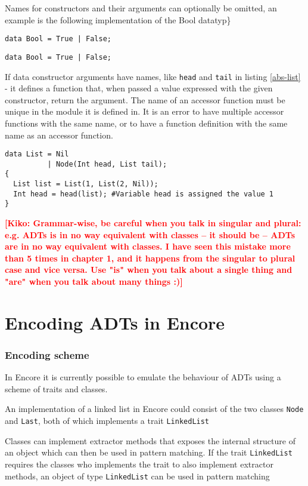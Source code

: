 \documentclass[10pt]{report}
\newcommand{\KIKO}[1]{\textcolor{red}{\textbf{[Kiko: #1]}}}
\def\code#1{\texttt{#1}} %
\begin{document}
\par{Names for constructors and their arguments can optionally be omitted, an example is the following implementation of the Bool datatyp\}

\begin{lstlisting}[language=encore,caption={Actual definition of built-in type Bool},label=test-kiko]
data Bool = True | False;
\end{lstlisting}

\begin{lstlisting}[language=encore,caption={Actual definition of built-in type Bool}]
data Bool = True | False;
\end{lstlisting}
\par{If data constructor arguments have names, like \code{head} and \code{tail} in listing \ref{abs-list} - it defines a function that, when passed a value expressed with the given constructor, return the argument.  The name of an accessor function must be unique in the module it is defined in. It is an error to have multiple accessor functions with the same name, or to have a function definition with the same name as an accessor function.}

\begin{lstlisting}[language=encore,caption={Accessor funtion in ABS},label=abs-list]
data List = Nil
          | Node(Int head, List tail);
{
  List list = List(1, List(2, Nil));
  Int head = head(list); #Variable head is assigned the value 1
}
\end{lstlisting}


\KIKO{Grammar-wise, be careful when you talk in singular and plural: e.g. ADTs is in no way equivalent with classes -- it should be -- ADTs are in no way equivalent with classes. I have seen this mistake more than
5 times in chapter 1, and it happens from the singular to plural case and vice versa. Use "is" when you talk about a single thing and "are" when you talk about many things :)}

\chapter{Encoding ADTs in Encore}
\subsection{Encoding scheme}
\par{In Encore it is currently possible to emulate the behaviour of ADTs using a scheme of traits and classes.}\cite{gustavL}%
\par{An implementation of a linked list in Encore could consist of the two classes \code{Node} and \code{Last}, both of which implements a trait \code{LinkedList}}
\par{Classes can implement extractor methods that exposes the internal structure of an object which can then be used in pattern matching. If the trait \code{LinkedList} requires the classes who implements the trait to also implement extractor methods, an object of type \code{LinkedList} can be used in pattern matching}

}
\end{document}
